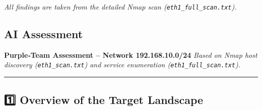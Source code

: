\emph{All findings are taken from the detailed Nmap scan
    (\texttt{eth1\_full\_scan.txt}).}

\subsection{AI Assessment}\label{ai-assessment}

\textbf{Purple‑Team Assessment -- Network 192.168.10.0/24} \emph{Based
on Nmap host discovery (\texttt{eth1\_scan.txt}) and service enumeration
    (\texttt{eth1\_full\_scan.txt}).}

\begin{center}
            \rule{0.5\linewidth}{0.5pt}
\end{center}

\subsection{1️⃣ Overview of the Target
Landscape}\label{overview-of-the-target-landscape}

